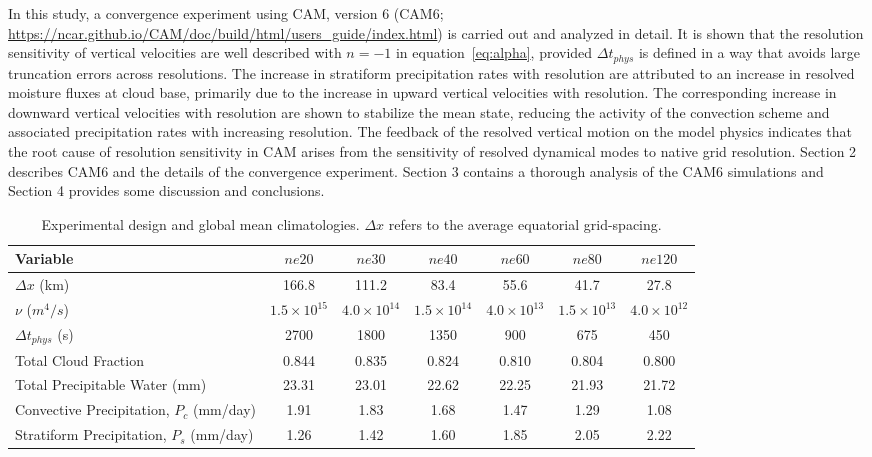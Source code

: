 \documentclass[alpha-refs]{wiley-article}
\begin{document}
In this study, a convergence experiment using CAM, version 6 (CAM6; \url{https://ncar.github.io/CAM/doc/build/html/users_guide/index.html}) is carried out and analyzed in detail. It is shown that the resolution sensitivity of vertical velocities are well described with $n=-1$ in equation~\eqref{eq:alpha}, provided $\Delta t_{phys}$ is defined in a way that avoids large truncation errors across resolutions. The increase in stratiform precipitation rates with resolution are attributed to an increase in resolved moisture fluxes at cloud base, primarily due to the increase in upward vertical velocities with resolution. The corresponding increase in downward vertical velocities with resolution are shown to stabilize the mean state, reducing the activity of the convection scheme and associated precipitation rates with increasing resolution. The feedback of the resolved vertical motion on the model physics indicates that the root cause of resolution sensitivity in CAM arises from the sensitivity of resolved dynamical modes to native grid resolution. Section 2 describes CAM6 and the details of the convergence experiment. Section 3 contains a thorough analysis of the CAM6 simulations and Section 4 provides some discussion and conclusions.
 
 \begin{table}
 \caption{Experimental design and global mean climatologies. $\Delta x$ refers to the average equatorial grid-spacing.}
 \centering
 \scriptsize
 \begin{tabular}{lcccccc}
   \hline
   Variable & $ne20$ & $ne30$ & $ne40$ & $ne60$ & $ne80$ & $ne120$ \\ 
   \hline
   $\Delta x$ (km) & 166.8 & 111.2 & 83.4 & 55.6 & 41.7 & 27.8 \\
   $\nu$ ($m^4/s$) & $1.5 \times 10^{15}$ & $4.0 \times 10^{14}$ & $1.5 \times 10^{14}$ & $4.0 \times 10^{13}$  & $1.5 \times 10^{13}$ & $4.0 \times 10^{12}$\\
    $\Delta t_{phys}$ (s) & 2700 & 1800 & 1350 & 900 & 675 & 450 \\
   Total Cloud Fraction & 0.844 & 0.835 & 0.824 & 0.810 & 0.804 & 0.800 \\ 
   Total Precipitable Water (mm) & 23.31& 23.01 & 22.62 & 22.25 & 21.93 & 21.72 \\
   Convective Precipitation, $P_c$ (mm/day) & 1.91 & 1.83 & 1.68 & 1.47 & 1.29 & 1.08 \\
   Stratiform Precipitation, $P_s$ (mm/day) & 1.26 & 1.42 & 1.60 & 1.85 & 2.05 & 2.22 \\      
 \hline
 \end{tabular}
 \label{tbl:table1}
 \end{table}
 
\end{document}
